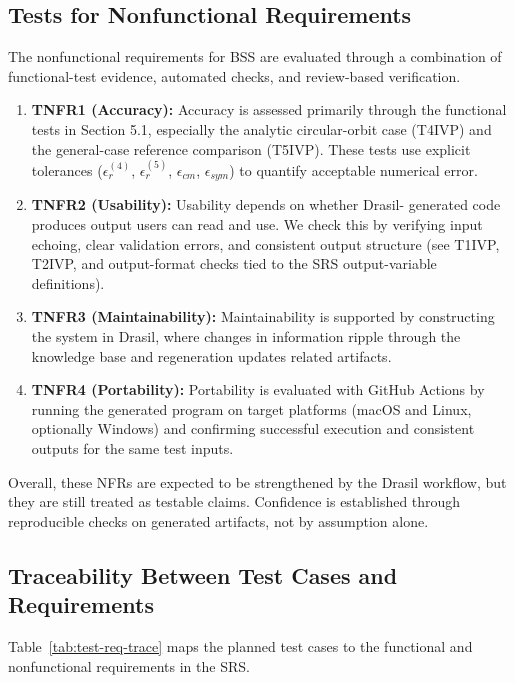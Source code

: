 \documentclass[12pt, titlepage]{article}
\begin{document}
\subsection{Tests for Nonfunctional Requirements}

The nonfunctional requirements for BSS are evaluated through a combination of
functional-test evidence, automated checks, and review-based verification.

\begin{enumerate}
  \item \textbf{TNFR1 (Accuracy):} Accuracy is assessed primarily through the
  functional tests in Section 5.1, especially the analytic circular-orbit case
  (T4IVP) and the general-case reference comparison (T5IVP). These tests use
  explicit tolerances ($\epsilon_r^{(4)}$, $\epsilon_r^{(5)}$,
  $\epsilon_{cm}$, $\epsilon_{sym}$) to
  quantify acceptable numerical error.

  \item \textbf{TNFR2 (Usability):} Usability depends on whether Drasil-
  generated code produces output users can read and use. We check this by
  verifying input echoing, clear validation errors, and consistent output
  structure (see T1IVP, T2IVP, and output-format checks tied to the SRS
  output-variable definitions).

  \item \textbf{TNFR3 (Maintainability):} Maintainability is supported by
  constructing the system in Drasil, where changes in information ripple
  through the knowledge base and regeneration updates related artifacts.

  \item \textbf{TNFR4 (Portability):} Portability is evaluated with GitHub
  Actions by running the generated program on target platforms (macOS and
  Linux, optionally Windows) and confirming successful execution and consistent
  outputs for the same test inputs.
\end{enumerate}

Overall, these NFRs are expected to be strengthened by the Drasil workflow, but
they are still treated as testable claims. Confidence is established through
reproducible checks on generated artifacts, not by assumption alone.

\subsection{Traceability Between Test Cases and Requirements}

Table~\ref{tab:test-req-trace} maps the planned test cases to the functional
and nonfunctional requirements in the SRS.
\end{document}
